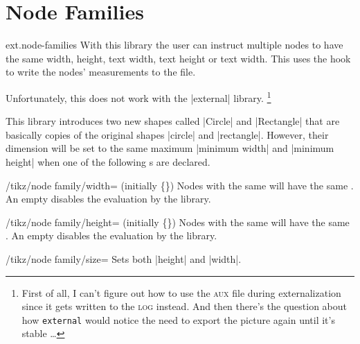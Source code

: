 %
%
%
\section{Node Families}
\begin{tikzlibrary}{ext.node-families}
  With this library the user can instruct multiple nodes to have the same
  width, height, text width, text height or text width.
  This uses the hook  to write the nodes'
  measurements to the  file.
  
  Unfortunately, this does not work with the |external| library.%
  \footnote{First of all, I can't figure out how to use the \textsc{aux} file during externalization since it gets written to the \textsc{log} instead.
            And then there's the question about how \texttt{external} would notice the need to export the picture again until it's stable \dots}
\end{tikzlibrary}

This library introduces two new shapes called |Circle| and |Rectangle|
that are basically copies of the original shapes |circle| and |rectangle|.
However, their dimension will be set to the same maximum |minimum width| and |minimum height|
when one of the following s are declared.
\begin{key}{/tikz/node family/width= (initially \{\})}
Nodes with the same  will have the same .
An empty  disables the evaluation by the library.
\begin{codeexample}[preamble=\usetikzlibrary{positioning,ext.node-families},/tikz/node distance=.5cm]
\tikzexternaldisable %
\end{codeexample}
\end{key}
\begin{key}{/tikz/node family/height= (initially \{\})}
Nodes with the same  will have the same .
An empty  disables the evaluation by the library.
\end{key}
\begin{key}{/tikz/node family/size=}
Sets both |height| and |width|.
\end{key}

